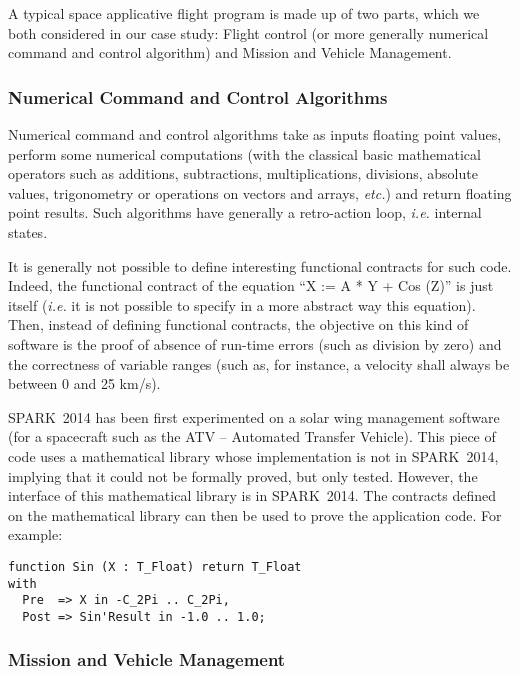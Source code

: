 \documentclass[10pt,a4paper,twocolumn]{article}
\newcommand{\newspark}{SPARK~2014\xspace}
\newcommand{\etc}{\textit{etc.}\xspace}
\newcommand{\ie}{\textit{i.e.}\xspace}
\begin{document}
A typical space applicative flight program is made up of two parts, which we
both considered in our case study:
Flight control (or more generally numerical command and control algorithm) and
Mission and Vehicle Management.

\subsubsection{Numerical Command and Control Algorithms}

Numerical command and control algorithms take as inputs floating point values,
perform some numerical computations (with the classical basic mathematical
operators such as additions, subtractions, multiplications, divisions, absolute
values, trigonometry or operations on vectors and arrays, \etc) and return
floating point results. Such algorithms have generally a retro-action loop, \ie
internal states.

It is generally not possible to define interesting functional contracts for
such code. Indeed, the functional contract of the equation
``X := A * Y + Cos (Z)''
is just itself (\ie it is not possible to specify in a more abstract way this
equation). Then, instead of defining functional contracts, the objective on
this kind of software is the proof of absence of run-time errors (such as
division by zero) and the correctness of variable ranges (such as, for
instance, a velocity shall always be between 0 and 25 km/s).

\newspark has been first experimented on a solar wing management software (for a spacecraft such as the ATV -- Automated Transfer Vehicle).
This piece of code uses a mathematical library whose implementation is not in
\newspark, implying that it could not be formally proved, but only tested.
However, the interface of this mathematical library is in \newspark. The
contracts defined on the mathematical library can then be used to prove the
application code. For example:

\begin{lstlisting}
function Sin (X : T_Float) return T_Float
with
  Pre  => X in -C_2Pi .. C_2Pi,
  Post => Sin'Result in -1.0 .. 1.0;
\end{lstlisting}

\subsubsection{Mission and Vehicle Management}
\end{document}
